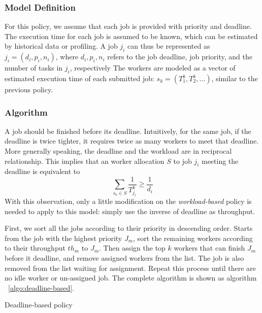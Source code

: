 \subsubsection{Model Definition}

For this policy, we assume that each job is provided with priority and
deadline.
The execution time for each job is assumed to be known, which can be 
estimated by historical data or profiling.
A job $j_i$ can thus be represented as $j_i = (d_i, p_i, n_i)$, where
$d_i, p_i, n_i$ refers to the job deadline, job priority, and the 
number of tasks in $j_i$, respectively
The workers are modeled as a vector of estimated execution time of each 
submitted job: $s_k = (T^k_1, T^k_2, \ldots)$, similar to the previous 
policy.

\subsubsection{Algorithm}

A job should be finished before its deadline.
Intuitively, for the same job, if the deadline is twice tighter, it
requires twice as many workers to meet that deadline.
More generally speaking, the deadline and the workload are in reciprocal
relationship.
This implies that an worker allocation $S$ to job $j_i$ meeting the
deadline is equivalent to
\[\displaystyle\sum_{s_k \in S}\frac{1}{T^k_{j_i}} \geq \frac{1}{d_i}\]
With this observation, only a little modification on the {\em workload-based}
policy is needed to apply to this model: simply use the inverse of
deadline as throughput.

First, we sort all the jobs according to their priority in descending
order.
Starts from the job with the highest priority $J_m$, sort the remaining
workers according to their throughput $th_m$ to $J_m$.
Then assign the top $k$ workers that can finish $J_m$ before it 
deadline, and remove assigned workers from the list.
The job is also removed from the list waiting for assignment.
Repeat this process until there are no idle worker or un-assigned job.
The complete algorithm is shown as algorithm ~\ref{algo:deadline-based}.

\begin{algorithm}[htbp]
  
  \caption{Deadline-based policy}
  \label{algo:deadline-based}
\end{algorithm}


